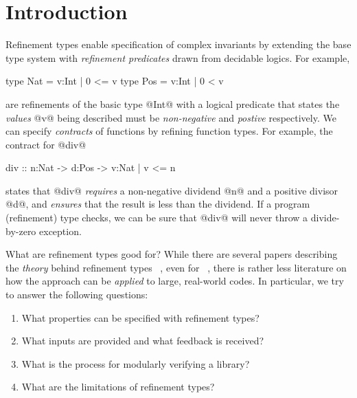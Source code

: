 \section{Introduction}\label{sec:introduction}

Refinement types enable specification of complex invariants 
by extending the base type system with \emph{refinement predicates} 
drawn from decidable logics. For example,
%
\begin{code}
  type Nat = {v:Int | 0 <= v}
  type Pos = {v:Int | 0 <  v}
\end{code}
%
are refinements of the basic type @Int@ with a logical predicate 
that states the \emph{values} @v@ being described must be 
\emph{non-negative} and \emph{postive} respectively. 
%
We can specify \emph{contracts} of functions by refining function types. 
For example, the contract for @div@
%
\begin{code}
  div :: n:Nat -> d:Pos -> {v:Nat | v <= n}
\end{code}
%
states that @div@ \emph{requires} a non-negative dividend @n@ and a positive
divisor @d@, and \emph{ensures} that the result is less than the dividend.
%
If a program (refinement) type checks, we can be sure that @div@ will never 
throw a divide-by-zero exception.

What are refinement types good for?
%
While there are several papers describing the \emph{theory} behind  
refinement types 
~\cite{Zenger97,pfenningxi98,ORS92,flanagan06,GordonTOPLAS2011,fstar,LiquidPLDI08}, 
even for \toolname~\cite{LiquidICFP14}, there is rather less 
literature on how the approach can be \emph{applied} to large, real-world
codes. In particular, we try to answer the following questions:
%
\begin{enumerate}
  \item What properties can be specified with refinement types?
  \item What inputs are provided and what feedback is received?
  \item What is the process for modularly verifying a library?
  \item What are the limitations of refinement types? 
\end{enumerate}

